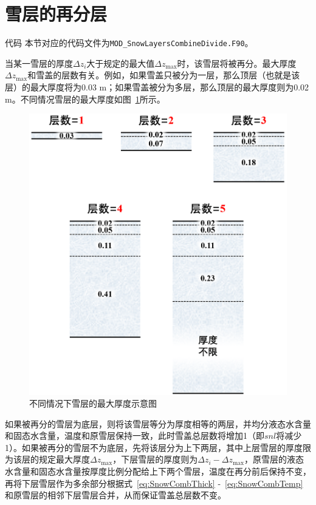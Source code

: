 \section{雪层的再分层}\label{雪层的再分层}
\begin{mymdframed}{代码}
  本节对应的代码文件为\texttt{MOD\_SnowLayersCombineDivide.F90}。
\end{mymdframed}

当某一雪层的厚度$\Delta z_i$大于规定的最大值$\Delta z_{\mathrm{max}}$时，该雪层将被再分。最大厚度$\Delta z_{\mathrm{max}}$和雪盖的层数有关。例如，如果雪盖只被分为一层，那么顶层（也就是该层）的最大厚度将为0.03 \unit{m}；如果雪盖被分为多层，那么顶层的最大厚度则为0.02 \unit{m}。不同情况雪层的最大厚度如图~\ref{fig:不同情况下雪层的最大厚度}所示。

{
  \begin{figure}[htbp]
    \centering
    \includegraphics[width=0.6\columnwidth]{Figures/雪盖土壤热力过程/不同情况下雪层的最大厚度.png}
    \caption{不同情况下雪层的最大厚度示意图}
    \label{fig:不同情况下雪层的最大厚度}
  \end{figure}
}

如果被再分的雪层为底层，则将该雪层等分为厚度相等的两层，并均分液态水含量和固态水含量，温度和原雪层保持一致，此时雪盖总层数将增加1（即$snl$将减少1）。如果被再分的雪层不为底层，先将该层分为上下两层，其中上层雪层的厚度限为该层的规定最大厚度$\Delta z_{\mathrm{max}}$，下层雪层的厚度则为$\Delta z_i - \Delta z_{\mathrm{max}}$，原雪层的液态水含量和固态水含量按厚度比例分配给上下两个雪层，温度在再分前后保持不变，再将下层雪层作为多余部分根据式~\eqref{eq:SnowCombThick} -~\eqref{eq:SnowCombTemp}和原雪层的相邻下层雪层合并，从而保证雪盖总层数不变。

